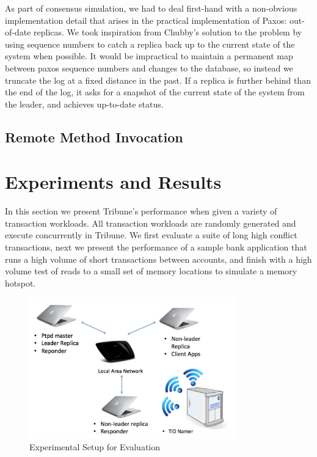 \documentclass[10pt,twocolumn]{article}
\begin{document}
As part of consensus simulation, we had to deal first-hand with a non-obvious implementation detail that arises in the practical implementation of Paxos: out-of-date replicas. We took inspiration from Chubby's solution to the problem  \cite{chandra_paxos_2007} by using sequence numbers to catch a replica back up to the current state of the system when possible. It would be impractical to maintain a permanent map between paxos sequence numbers and changes to the database, so instead we truncate the log at a fixed distance in the past. If a replica is further behind than the end of the log, it asks for a snapshot of the current state of the system from the leader, and achieves up-to-date status.


\subsection{Remote Method Invocation}

\section{Experiments and Results}

In this section we present Tribune's performance when given a variety of transaction workloads. All transaction workloads are randomly generated and execute concurrently in Tribune. We first evaluate a suite of long high conflict transactions, next we present the performance of a sample bank application that runs a high volume of short transactions between accounts, and finish with a high volume test of reads to a small set of memory locations to simulate a memory hotspot. 

\begin{figure}[!b]
  \begin{center}
    \includegraphics[width=3.5in]{Images/test-setup.png}
  \end{center}

  \caption{\small Experimental Setup for Evaluation }
  \label{test-setup}
\end{figure}
\end{document}
